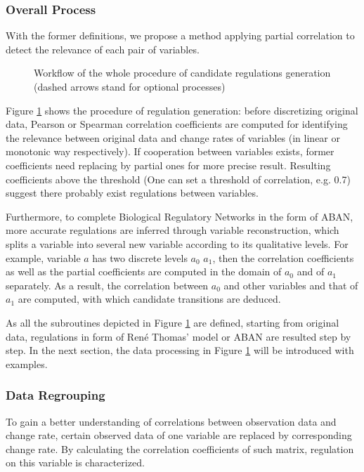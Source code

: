 \subsubsection{Overall Process}

With the former definitions, we propose a method applying partial correlation to detect the relevance of each pair of variables.

\begin{figure}[ht]

\caption[Workflow of model inference via partial correlation]{Workflow of the whole procedure of candidate regulations generation (dashed arrows stand for optional processes)}\label{plan}
\end{figure}

Figure \ref{plan} shows the procedure of regulation generation: before discretizing original data, Pearson or Spearman correlation coefficients \cite{samaga2009logic,hauke2011comparison} are computed for identifying the relevance between original data and change rates of variables (in linear or monotonic way respectively). If cooperation between variables exists, former coefficients need replacing by partial ones \cite{de2004discovery} for more precise result.
Resulting coefficients above the threshold (One can set a threshold of correlation, e.g. 0.7) suggest there probably exist regulations between variables.

Furthermore, to complete Biological Regulatory Networks in the form of ABAN, more accurate regulations are inferred through variable reconstruction, which splits a variable into several new variable according to its qualitative levels.
For example, variable $a$ has two discrete levels $a_0$ $a_1$, then the correlation coefficients as well as the partial coefficients are computed in the domain of $a_0$ and of $a_1$ separately.
As a result, the correlation between $a_0$ and other variables and that of $a_1$ are computed, with which candidate transitions are deduced.

As all the subroutines depicted in Figure \ref{plan} are defined, starting from original data, regulations in form of Ren\'e Thomas' model \cite{thomas1978} or ABAN are resulted step by step. In the next section, the data processing in Figure \ref{plan} will be introduced with examples.

\subsubsection*{Data Regrouping}
To gain a better understanding of correlations between observation data and change rate, certain observed data of one variable are replaced by corresponding change rate. By calculating the correlation coefficients of such matrix, regulation on this variable is characterized.

